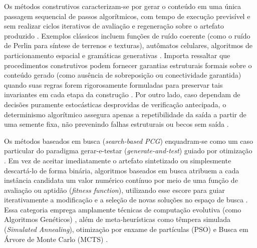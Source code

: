 Os métodos construtivos caracterizam-se por gerar o conteúdo em uma única passagem sequencial de passos algorítmicos, com tempo de execução previsível e sem realizar ciclos iterativos de avaliação e regeneração sobre o artefato produzido \cite{shaker2016constructive, summerville2018procedural}. Exemplos clássicos incluem funções de ruído coerente (como o ruído de Perlin para síntese de terrenos e texturas), autômatos celulares, algoritmos de particionamento espacial e gramáticas generativas \cite{linden2014dungeons, shaker2016constructive, maleki2024procedural}. Importa ressaltar que procedimentos construtivos podem fornecer garantias estruturais formais sobre o conteúdo gerado (como ausência de sobreposição ou conectividade garantida) quando suas regras forem rigorosamente formuladas para preservar tais invariantes em cada etapa da construção \cite{shaker2016constructive}. Por outro lado, caso dependam de decisões puramente estocásticas desprovidas de verificação antecipada, o determinismo algorítmico assegura apenas a repetibilidade da saída a partir de uma semente fixa, não prevenindo falhas estruturais ou becos sem saída \cite{linden2014dungeons, shaker2016constructive}.

Os métodos baseados em busca (\textit{search-based PCG}) enquadram-se como um caso particular do paradigma gerar-e-testar (\textit{generate-and-test}) guiado por otimização \cite{togelius2011search, pcgbook, maleki2024procedural}. Em vez de aceitar imediatamente o artefato sintetizado ou simplesmente descartá-lo de forma binária, algoritmos baseados em busca atribuem a cada instância candidata um valor numérico contínuo por meio de uma função de avaliação ou aptidão (\textit{fitness function}), utilizando esse escore para guiar iterativamente a modificação e a seleção de novas soluções no espaço de busca \cite{togelius2011search, linden2014dungeons, araujo2018geracao, maleki2024procedural}. Essa categoria emprega amplamente técnicas de computação evolutiva (como Algoritmos Genéticos) \cite{togelius2011search, linden2014dungeons, maleki2024procedural}, além de meta-heurísticas como têmpera simulada (\textit{Simulated Annealing}), otimização por enxame de partículas (PSO) e Busca em Árvore de Monte Carlo (MCTS) \cite{maleki2024procedural, xu2025constraint}.

